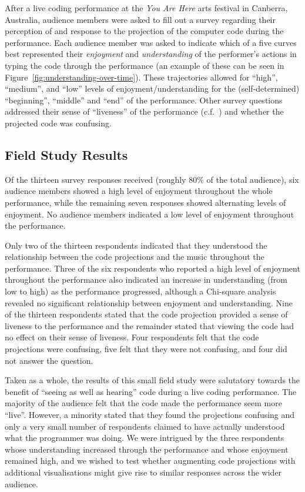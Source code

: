 \documentclass{sig-alternate}
\begin{document}
After a live coding performance at the \emph{You Are Here} arts
festival in Canberra, Australia, audience members were asked to fill
out a survey regarding their perception of and response to the
projection of the computer code during the performance. Each audience
member was asked to indicate which of a five curves best represented
their \emph{enjoyment} and \emph{understanding} of the performer's
actions in typing the code through the performance (an example of
these can be seen in Figure~\ref{fig:understanding-over-time}). These
trajectories allowed for ``high'', ``medium'', and ``low'' levels of
enjoyment/understanding for the (self-determined) ``beginning'',
``middle'' and ``end'' of the performance. Other survey questions
addressed their sense of ``liveness'' of the performance
(c.f.~\cite{Auslander}) and whether the projected code was confusing.

\subsection{Field Study Results}

Of the thirteen survey responses received (roughly $80\%$ of the total
audience), six audience members showed a high level of enjoyment
throughout the whole performance, while the remaining seven responses
showed alternating levels of enjoyment. No audience members indicated
a low level of enjoyment throughout the performance.

Only two of the thirteen respondents indicated that they understood
the relationship between the code projections and the music throughout
the performance. Three of the six respondents who reported a high
level of enjoyment throughout the performance also indicated an
increase in understanding (from low to high) as the performance
progressed, although a Chi-square analysis revealed no significant
relationship between enjoyment and understanding. Nine of the thirteen
respondents stated that the code projection provided a sense of
liveness to the performance and the remainder stated that viewing the
code had no effect on their sense of liveness. Four respondents felt
that the code projections were confusing, five felt that they were not
confusing, and four did not answer the question.

Taken as a whole, the results of this small field study were
salutatory towards the benefit of ``seeing as well as hearing'' code
during a live coding performance. The majority of the audience felt
that the code made the performance seem more ``live''. However, a
minority stated that they found the projections confusing and only a
very small number of respondents claimed to have actually understood
what the programmer was doing. We were intrigued by the three
respondents whose understanding increased through the performance and
whose enjoyment remained high, and we wished to test whether
augmenting code projections with additional visualisations might give
rise to similar responses across the wider audience.
\end{document}
